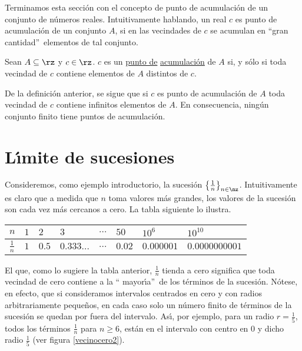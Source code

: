 Terminamos esta secci\'{o}n con el concepto de punto de acumulaci\'{o}n de un
conjunto de n\'{u}meros reales. Intuitivamente hablando, un real $c$ es punto
de acumulaci\'{o}n de un conjunto $A$, si en las vecindades de $c$ se acumulan
en \textquotedblleft gran cantidad\textquotedblright\ elementos de tal conjunto.

\begin{definition}
Sean $A\subseteq\rz$ y $c\in\rz$. $c$ es un%
\underline{punto de} \underline{acumulaci\'{o}n} de $A$ si, y s\'{o}lo si toda
vecindad de $c$ contiene elementos de $A$ distintos de $c$.
\end{definition}

De la definici\'{o}n anterior, se sigue que si $c$ es punto de acumulaci\'{o}n
de $A$ toda vecindad de $c$ contiene infinitos elementos de $A$. En
consecuencia, ning\'{u}n conjunto finito tiene puntos de acumulaci\'{o}n.

\section{L\'{\i}mite de sucesiones}

Consideremos, como ejemplo introductorio, la sucesi\'{o}n $\left\{  \frac
{1}{n}\right\}  _{n\in\nz}$. Intuitivamente es claro que a medida que $n$ toma
valores m\'{a}s grandes, los valores de la sucesi\'{o}n son cada vez m\'{a}s
cercanos a cero. La tabla siguiente lo ilustra.

\begin{center}%
\begin{tabular}
[c]{|l||l|l|l|l|l|l|l|}\hline
$n$ & $1$ & $2$ & $3$ & $\dots$ & $50$ & $10^{6}$ & $10^{10}$\\\hline
$\frac{1}{n}$ & $1$ & $0.5$ & $0.333...$ & $\dots$ & $0.02$ & $0.000001$ &
$0.0000000001$\\\hline
\end{tabular}



\end{center}

El que, como lo sugiere la tabla anterior, $\frac{1}{n}$ tienda a cero
significa que toda vecindad de cero contiene a la \textquotedblleft
mayor\'{\i}a\textquotedblright\ de los t\'{e}rminos de la sucesi\'{o}n.
N\'{o}tese, en efecto, que si conside\-ramos intervalos centrados en cero y
con radios arbitrariamente peque\~{n}os, en cada caso solo un n\'{u}mero
finito de t\'{e}rminos de la sucesi\'{o}n se quedan por fuera del intervalo.
As\'{\i}, por ejemplo, para un radio $r=\frac{1}{5}$, todos los t\'{e}rminos
$\frac{1}{n}$ para $n\geq6$, est\'{a}n en el intervalo con centro en $0$ y
dicho radio $\frac{1}{5}$ (ver figura \ref{vecinocero2}).%


